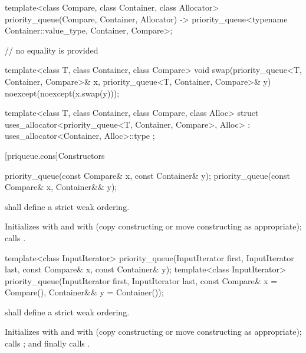\begin{codeblock}
{  template<class Compare, class Container, class Allocator>
    priority_queue(Compare, Container, Allocator)
      -> priority_queue<typename Container::value_type, Container, Compare>;

  // no equality is provided

  template<class T, class Container, class Compare>
    void swap(priority_queue<T, Container, Compare>& x,
              priority_queue<T, Container, Compare>& y) noexcept(noexcept(x.swap(y)));

  template<class T, class Container, class Compare, class Alloc>
    struct uses_allocator<priority_queue<T, Container, Compare>, Alloc>
      : uses_allocator<Container, Alloc>::type { };
}
\end{codeblock}

[priqueue.cons]{Constructors}

%
\begin{itemdecl}
priority_queue(const Compare& x, const Container& y);
priority_queue(const Compare& x, Container&& y);
\end{itemdecl}

\begin{itemdescr}
\pnum
\requires
{} shall define a strict weak ordering.

\pnum
\effects
Initializes
 with
 and
 with
 (copy constructing or move constructing as appropriate);
calls
.
\end{itemdescr}

%
\begin{itemdecl}
template<class InputIterator>
  priority_queue(InputIterator first, InputIterator last, const Compare& x, const Container& y);
template<class InputIterator>
  priority_queue(InputIterator first, InputIterator last, const Compare& x = Compare(),
                 Container&& y = Container());
\end{itemdecl}

\begin{itemdescr}
\pnum
\requires
{} shall define a strict weak ordering.

\pnum
\effects
Initializes
 with
 and
 with
 (copy constructing or move constructing as appropriate);
calls
;
and finally calls
.
\end{itemdescr}

